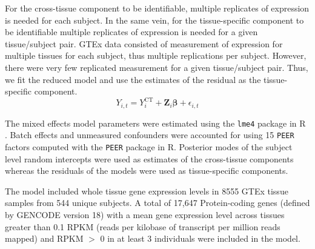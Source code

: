 \documentclass[10pt,letterpaper]{article}
\begin{document}
For the cross-tissue component to be identifiable, multiple replicates of expression is needed for each subject. In the same vein, for the tissue-specific component to be identifiable multiple replicates of expression is needed for a given tissue/subject pair. GTEx\cite{Ardlie_2015}  data consisted of measurement of expression for multiple tissues for each subject, thus multiple replications per subject. However, there were very few replicated measurement for a given tissue/subject pair. Thus, we fit the reduced model and use the estimates of the residual as the tissue-specific component.
%
\[Y_{i,t} =  Y_{i}^{\text{CT}}   + \mathbf{Z}_i \boldsymbol{\beta} + \epsilon_{i,t}  \] 
%


The mixed effects model parameters were estimated using the \texttt{lme4} package \cite{Bates_2015a} in R \cite{R_Core_Team_2015}. Batch effects and unmeasured confounders were accounted for using 15 \texttt{PEER} factors computed with the \texttt{PEER} \cite{Stegle_2012} package in R. Posterior modes of the subject level random intercepts were used as estimates of the cross-tissue components whereas the residuals of the models were used as tissue-specific components.

The model included whole tissue gene expression levels in 8555 GTEx
tissue samples from 544 unique subjects. A total of 17,647
Protein-coding genes (defined by GENCODE \cite{Harrow_2012} version 18) with a
mean gene expression level across tissues greater than 0.1 RPKM (reads
per kilobase of transcript per million reads mapped) and RPKM $>$ 0 in at least 3 individuals were included in
the model. 

\end{document}
